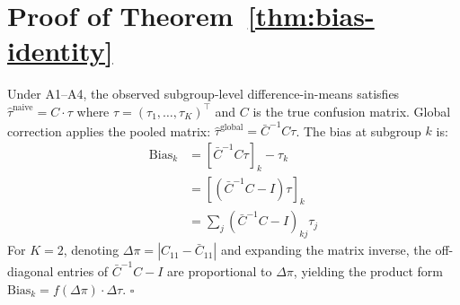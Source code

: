 \documentclass[11pt]{article}
\begin{document}


\appendix

\section{Proof of Theorem~\ref{thm:bias-identity}}
\label{app:proof}

Under A1--A4, the observed subgroup-level difference-in-means satisfies $\hat{\tau}^{\text{naive}} = C \cdot \tau$ where $\tau = (\tau_1, \ldots, \tau_K)^\top$ and $C$ is the true confusion matrix.
Global correction applies the pooled matrix: $\hat{\tau}^{\text{global}} = \bar{C}^{-1} C \tau$.
The bias at subgroup $k$ is:
\begin{align}
\text{Bias}_k &= [\bar{C}^{-1} C \tau]_k - \tau_k \\
&= [(\bar{C}^{-1} C - I) \tau]_k \\
&= \sum_{j} (\bar{C}^{-1} C - I)_{kj} \tau_j
\end{align}
For $K{=}2$, denoting $\Delta\pi = |C_{11} - \bar{C}_{11}|$ and expanding the matrix inverse, the off-diagonal entries of $\bar{C}^{-1} C - I$ are proportional to $\Delta\pi$, yielding the product form $\text{Bias}_k = f(\Delta\pi) \cdot \Delta\tau$. \hfill $\square$
\end{document}
